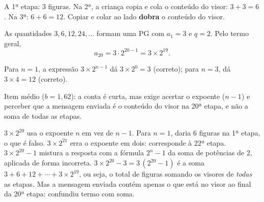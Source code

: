 \begin{resolucao}{A}
 1ª etapa: 3 figuras. Na 2ª, a
criança copia e cola o conteúdo do visor: $3 + 3 = 6$. Na 3ª: $6 + 6 = 12$.
Copiar e colar ao lado \textbf{dobra} o conteúdo do visor.

 As quantidades $3, 6, 12, 24, \dots$ formam uma PG
com $a_1 = 3$ e $q = 2$. Pelo termo geral,
\[
a_{20} = 3 \cdot 2^{20 - 1} = 3 \times 2^{19}.
\]

 Para $n = 1$, a expressão $3 \times 2^{n-1}$ dá
$3 \times 2^0 = 3$ (correto); para $n = 3$, dá $3 \times 4 = 12$ (correto).


Item médio ($b = 1{,}62$): a conta é curta, mas exige acertar o expoente
($n - 1$) e perceber que a mensagem enviada é o conteúdo do visor na 20ª etapa,
e não a soma de todas as etapas.

\begin{distratores}
 $3 \times 2^{20}$ usa o expoente $n$ em vez de $n - 1$. Para $n = 1$,
daria 6 figuras na 1ª etapa, o que é falso.
 $3 \times 2^{21}$ erra o expoente em dois: corresponde à 22ª etapa.
 $3 \times 2^{20} - 1$ mistura a resposta com a fórmula
$2^n - 1$ da soma de potências de 2, aplicada de forma incorreta.
 $3 \times 2^{20} - 3 = 3\,(2^{20} - 1)$ é a soma
$3 + 6 + 12 + \cdots + 3 \times 2^{19}$, ou seja, o total de figuras somando os
visores de \emph{todas} as etapas. Mas a mensagem enviada contém apenas o que
está no visor ao final da 20ª etapa: confundiu termo com soma.
\end{distratores}
\end{resolucao}

